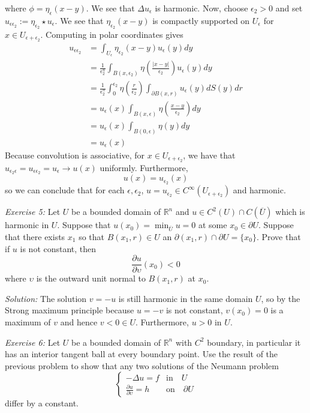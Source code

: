 \documentclass{article}
\newcommand{\exercise}[2]{
\vspace{0.2in}\begin{mdframed}[
  backgroundcolor=problem,
  skipabove=\topsep,
  skipbelow=\topsep
  ]
  \emph{Exercise {#1}:} {#2}
\end{mdframed}}
\newcommand{\R}{\mathbb{R}}
\begin{document}
    where $\phi = \eta_\epsilon(x-y)$. We see that $\Delta u_\epsilon$ is harmonic.
    Now, choose $\epsilon_2 > 0$ and set $u_{\epsilon\epsilon_2} := \eta_{\epsilon_2}\star u_\epsilon$. We see that $\eta_{\epsilon_2}(x-y)$ is compactly supported on $U_{\epsilon}$ for $x\in U_{\epsilon + \epsilon_2}$.
    Computing in polar coordinates gives
    \begin{align*}
      u_{\epsilon\epsilon_2} &= \int_{U_\epsilon}\eta_{\epsilon_2}(x-y)u_\epsilon(y)dy \\
      &= \frac{1}{\epsilon_2^n}\int_{B(x,\epsilon_2)}\eta\left(\frac{|x-y|}{\epsilon_2}\right)u_\epsilon(y)dy \\
      &= \frac{1}{\epsilon_2^n}\int_0^{\epsilon_2}\eta\left(\frac{r}{\epsilon_2}\right)\int_{\partial B(x,r)}u_\epsilon(y)dS(y)dr \\
      &= u_\epsilon(x)\int_{B(x,\epsilon)}\eta\left(\frac{x-y}{\epsilon_2}\right)dy \\
      &= u_\epsilon(x)\int_{B(0,\epsilon)}\eta\left(y\right)dy \\
      &= u_\epsilon(x)
    \end{align*}
    Because convolution is associative, for $x\in U_{\epsilon+\epsilon_2}$, we have that $u_{\epsilon_2\epsilon} = u_{\epsilon\epsilon_2} = u_\epsilon \to u(x)$ uniformly. Furthermore,
    \[u(x) = u_{\epsilon_2}(x)\] so we can conclude that for each $\epsilon,\epsilon_2$, $u = u_{\epsilon_2} \in C^\infty(U_{\epsilon + \epsilon_2})$ and harmonic.
    \exercise{5}{Let $U$ be a bounded domain of $\R^n$ and $u\in C^2(U)\cap C(\overline{U})$ which is harmonic in $U$. Suppose that $u(x_0)=\min_{\overline{U}}u=0$ at some 
    $x_0\in \partial U$. Suppose that there exists $x_1$ so that $B(x_1,r)\in U$ an $\partial(x_1,r)\cap\partial U = \{x_0\}$. Prove that if $u$ is not constant, then 
    \[ \frac{\partial u}{\partial \upsilon}(x_0) < 0\]
    where $\upsilon$ is the outward unit normal to $B(x_1,r)$ at $x_0$.}
    \textit{Solution:} 
    The solution $v = -u$ is still harmonic in the same domain $U$, so by the Strong maximum principle because $u =-v$ is not constant, $v(x_0) = 0$ is a maximum of $v$ and hence $v < 0 \in U$. 
    Furthermore, $u > 0$ in $U$.
    \exercise{6}{Let $U$ be a bounded domain of $\R^n$ with $C^2$ boundary, in particular it has an interior tangent ball at every boundary point. Use the result of the previous problem to show that any two solutions of the Neumann problem
    \[\begin{cases}
      -\Delta u = f &\text{in}\quad U \\
      \frac{\partial u}{\partial \upsilon} = h &\text{on}\quad \partial U
    \end{cases}\]
    differ by a constant.}
\end{document}
